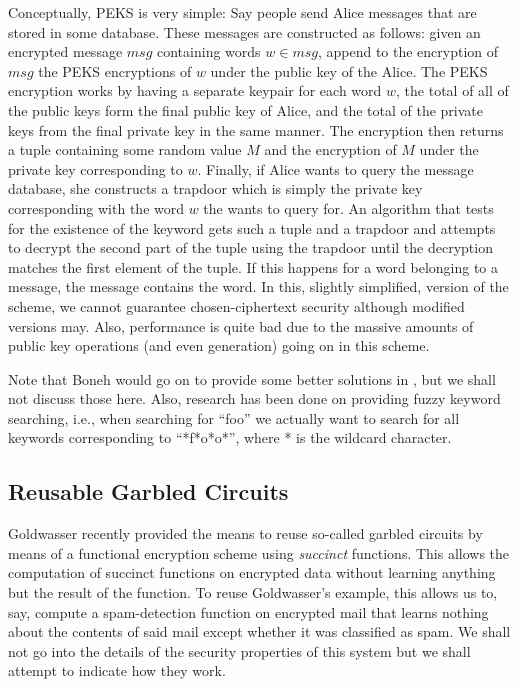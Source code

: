 \documentclass[11pt]{article}
\begin{document}
Conceptually, PEKS is very simple:
Say people send Alice messages that are stored in some database.
These messages are constructed as follows:
given an encrypted message $msg$ containing words $w \in msg$, append to the encryption of $msg$ the PEKS encryptions of $w$ under the public key of the Alice.
The PEKS encryption works by having a separate keypair for each word $w$, the total of all of the public keys form the final public key of Alice, and the total of the private keys  from the final private key in the same manner. The encryption then returns a tuple containing some random value $M$ and the encryption of $M$ under the private key corresponding to $w$.
Finally, if Alice wants to query the message database, she constructs a trapdoor which is simply the private key corresponding with the word $w$ the wants to query for.
An algorithm that tests for the existence of the keyword gets such a tuple and a trapdoor and attempts to decrypt the second part of the tuple using the trapdoor until the decryption matches the first element of the tuple.
If this happens for a word belonging to a message, the message contains the word. 
In this, slightly simplified, version of the scheme, we cannot guarantee chosen-ciphertext security although modified versions may.
Also, performance is quite bad due to the massive amounts of public key operations (and even generation) going on in this scheme.

Note that Boneh would go on to provide some better solutions in \cite{boneh2007public}, but we shall not discuss those here.
Also, research has been done \cite{li2010fuzzy} on providing fuzzy keyword searching, i.e., when searching for ``foo'' we actually want to search for all keywords corresponding to ``*f*o*o*'', where * is the wildcard character.




\subsection{Reusable Garbled Circuits}

Goldwasser \cite{goldwasser2013reusable} recently provided the means to reuse so-called garbled circuits by means of a functional encryption scheme using \emph{succinct} functions.
This allows the computation of succinct functions on encrypted data without learning anything but the result of the function.
To reuse Goldwasser's example, this allows us to, say, compute a spam-detection function on encrypted mail that learns nothing about the contents of said mail except whether it was classified as spam.
We shall not go into the details of the security properties of this system but we shall attempt to indicate how they work.
\end{document}

